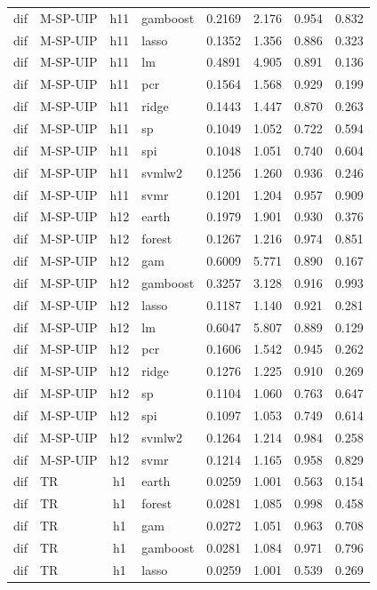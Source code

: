 \begin{ThreePartTable}
\begin{longtable}[t]{llclcccc}
dif & M-SP-UIP & h11 & gamboost & 0.2169 & 2.176 & 0.954 & 0.832\\
dif & M-SP-UIP & h11 & lasso & 0.1352 & 1.356 & 0.886 & 0.323\\
dif & M-SP-UIP & h11 & lm & 0.4891 & 4.905 & 0.891 & 0.136\\
dif & M-SP-UIP & h11 & pcr & 0.1564 & 1.568 & 0.929 & 0.199\\
dif & M-SP-UIP & h11 & ridge & 0.1443 & 1.447 & 0.870 & 0.263\\
dif & M-SP-UIP & h11 & sp & 0.1049 & 1.052 & 0.722 & 0.594\\
dif & M-SP-UIP & h11 & spi & 0.1048 & 1.051 & 0.740 & 0.604\\
dif & M-SP-UIP & h11 & svmlw2 & 0.1256 & 1.260 & 0.936 & 0.246\\
dif & M-SP-UIP & h11 & svmr & 0.1201 & 1.204 & 0.957 & 0.909\\
\addlinespace
dif & M-SP-UIP & h12 & earth & 0.1979 & 1.901 & 0.930 & 0.376\\
dif & M-SP-UIP & h12 & forest & 0.1267 & 1.216 & 0.974 & 0.851\\
dif & M-SP-UIP & h12 & gam & 0.6009 & 5.771 & 0.890 & 0.167\\
dif & M-SP-UIP & h12 & gamboost & 0.3257 & 3.128 & 0.916 & 0.993\\
dif & M-SP-UIP & h12 & lasso & 0.1187 & 1.140 & 0.921 & 0.281\\
dif & M-SP-UIP & h12 & lm & 0.6047 & 5.807 & 0.889 & 0.129\\
dif & M-SP-UIP & h12 & pcr & 0.1606 & 1.542 & 0.945 & 0.262\\
dif & M-SP-UIP & h12 & ridge & 0.1276 & 1.225 & 0.910 & 0.269\\
dif & M-SP-UIP & h12 & sp & 0.1104 & 1.060 & 0.763 & 0.647\\
dif & M-SP-UIP & h12 & spi & 0.1097 & 1.053 & 0.749 & 0.614\\
dif & M-SP-UIP & h12 & svmlw2 & 0.1264 & 1.214 & 0.984 & 0.258\\
dif & M-SP-UIP & h12 & svmr & 0.1214 & 1.165 & 0.958 & 0.829\\
\addlinespace
dif & TR & h1 & earth & 0.0259 & 1.001 & 0.563 & 0.154\\
dif & TR & h1 & forest & 0.0281 & 1.085 & 0.998 & 0.458\\
dif & TR & h1 & gam & 0.0272 & 1.051 & 0.963 & 0.708\\
dif & TR & h1 & gamboost & 0.0281 & 1.084 & 0.971 & 0.796\\
dif & TR & h1 & lasso & 0.0259 & 1.001 & 0.539 & 0.269\\

\end{longtable}
\end{ThreePartTable}
